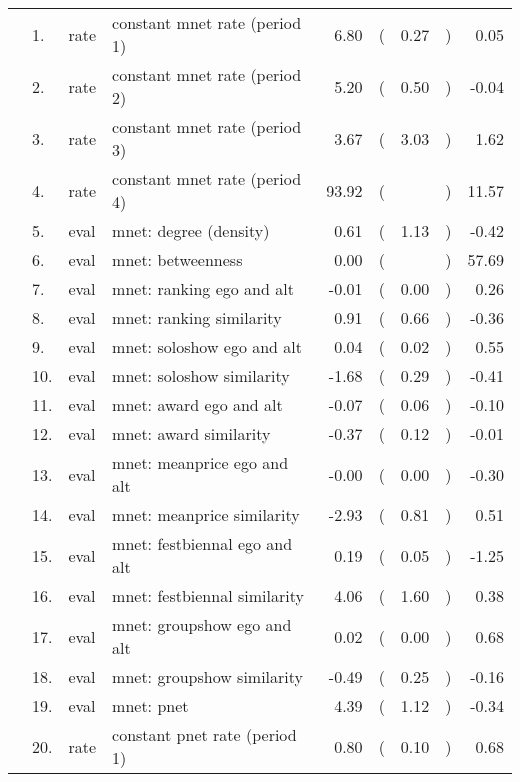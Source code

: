 \begin{table}[ht]
\centering
\begin{tabular}{llllrlrlr}
  \hline
  \hline
  &  1. & rate & constant mnet rate (period 1) & 6.80 & ( & 0.27 & ) & 0.05 \\ 
    &  2. & rate & constant mnet rate (period 2) & 5.20 & ( & 0.50 & ) & -0.04 \\ 
    &  3. & rate & constant mnet rate (period 3) & 3.67 & ( & 3.03 & ) & 1.62 \\ 
    &  4. & rate & constant mnet rate (period 4) & 93.92 & ( &  & ) & 11.57 \\ 
    &  5. & eval & mnet: degree (density) & 0.61 & ( & 1.13 & ) & -0.42 \\ 
    &  6. & eval & mnet: betweenness & 0.00 & ( &  & ) & 57.69 \\ 
    &  7. & eval & mnet: ranking ego and alt & -0.01 & ( & 0.00 & ) & 0.26 \\ 
    &  8. & eval & mnet: ranking similarity & 0.91 & ( & 0.66 & ) & -0.36 \\ 
    &  9. & eval & mnet: soloshow ego and alt & 0.04 & ( & 0.02 & ) & 0.55 \\ 
    & 10. & eval & mnet: soloshow similarity & -1.68 & ( & 0.29 & ) & -0.41 \\ 
    & 11. & eval & mnet: award ego and alt & -0.07 & ( & 0.06 & ) & -0.10 \\ 
    & 12. & eval & mnet: award similarity & -0.37 & ( & 0.12 & ) & -0.01 \\ 
    & 13. & eval & mnet: meanprice ego and alt & -0.00 & ( & 0.00 & ) & -0.30 \\ 
    & 14. & eval & mnet: meanprice similarity & -2.93 & ( & 0.81 & ) & 0.51 \\ 
    & 15. & eval & mnet: festbiennal ego and alt & 0.19 & ( & 0.05 & ) & -1.25 \\ 
    & 16. & eval & mnet: festbiennal similarity & 4.06 & ( & 1.60 & ) & 0.38 \\ 
    & 17. & eval & mnet: groupshow ego and alt & 0.02 & ( & 0.00 & ) & 0.68 \\ 
    & 18. & eval & mnet: groupshow similarity & -0.49 & ( & 0.25 & ) & -0.16 \\ 
    & 19. & eval & mnet: pnet & 4.39 & ( & 1.12 & ) & -0.34 \\ 
    & 20. & rate & constant pnet rate (period 1) & 0.80 & ( & 0.10 & ) & 0.68 \\ 

\end{tabular}
\end{table}
